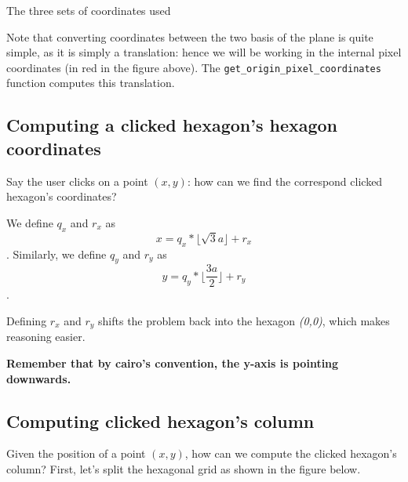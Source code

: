 \documentclass{article}
\begin{document}
\begin{center}

The three sets of coordinates used
\end{center}

Note that converting coordinates between the two basis of the plane is quite simple, as it is simply a translation: hence we will be working in the internal pixel coordinates (in red in the figure above). The \verb`get_origin_pixel_coordinates` function computes this translation.

\subsection{Computing a clicked hexagon's hexagon coordinates}
Say the user clicks on a point $(x,y)$: how can we find the correspond clicked hexagon's coordinates?

We define $q_x$ and $r_x$ as $$x = q_x*\lfloor \sqrt{3}a\rfloor + r_x$$. Similarly, we define $q_y$ and $r_y$ as $$y = q_y*\lfloor \frac{3a}{2}\rfloor + r_y$$.

Defining $r_x$ and $r_y$ shifts the problem back into the hexagon \textit{(0,0)}, which makes reasoning easier.

\textbf{Remember that by cairo's convention, the y-axis is pointing downwards.}

\subsection{Computing clicked hexagon's column}
Given the position of a point $(x,y)$, how can we compute the clicked hexagon's column? First, let's split the hexagonal grid as shown in the figure below.
\end{document}
